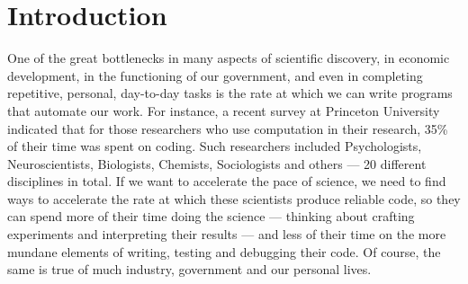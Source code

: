\section{Introduction}



One of the great bottlenecks in many aspects of scientific discovery,
in economic development, in the functioning of our government, and
even in completing repetitive, personal, day-to-day tasks is the rate
at which we can write programs that automate our work.  For instance,
a recent survey at Princeton University~\cite{computation-survey}
indicated that for those researchers who use computation in their
research, 35\% of their time was spent on coding.  Such researchers
included Psychologists, Neuroscientists, Biologists, Chemists,
Sociologists and others --- 20 different disciplines in total.  
If we want to accelerate the pace of science, we need
to find ways to accelerate the rate at which these scientists produce
reliable code, so they can spend more of their time doing the science
--- thinking about crafting experiments and interpreting their
results --- and less of their time on the more mundane elements of
writing, testing and debugging their code.  Of course, the same is
true of much industry, government and our personal lives.

